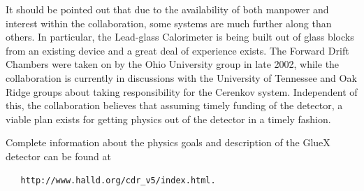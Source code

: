 \hspace{1cm}
It should be pointed out that due to the availability of both manpower
and interest within the collaboration, some systems are much further
along than others. In particular, the Lead-glass Calorimeter is
being built out of glass blocks from an existing device and a great
deal of experience exists. The Forward Drift Chambers were taken on
by the Ohio University group in late 2002, while the collaboration is
currently in discussions with the University of Tennessee and Oak
Ridge groups about taking responsibility for the Cerenkov system.
Independent of this, the collaboration believes that assuming timely
funding of the detector, a viable plan exists for getting physics 
out of the detector in a timely fashion. 

\bigskip
Complete information about the physics goals and description of the GlueX detector
can be found at
\begin{verbatim} 
   http://www.halld.org/cdr_v5/index.html.
\end{verbatim}



